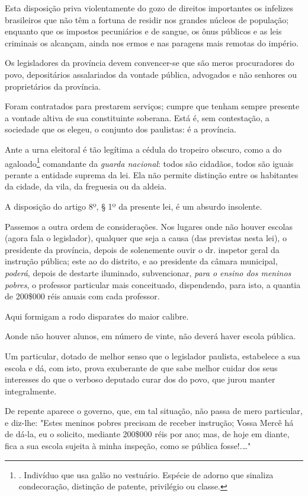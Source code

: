 Esta disposição priva violentamente do gozo de direitos importantes os
infelizes brasileiros que não têm a fortuna de residir nos grandes
núcleos de população; enquanto que os impostos pecuniários e de sangue,
os ônus públicos e as leis criminais os alcançam, ainda nos ermos e nas
paragens mais remotas do império.

Os legisladores da província devem convencer-se que são meros
procuradores do povo, depositários assalariados da vontade pública,
advogados e não senhores ou proprietários da província.

Foram contratados para prestarem serviços; cumpre que tenham sempre
presente a vontade altiva de sua constituinte soberana. Está é, sem
contestação, a sociedade que os elegeu, o conjunto dos paulistas: é a
província.

Ante a urna eleitoral é tão legítima a cédula do tropeiro obscuro, como
a do agaloado\footnote{. Indivíduo que usa galão no vestuário. Espécie
  de adorno que sinaliza condecoração, distinção de patente, privilégio
  ou classe.} comandante da \emph{guarda nacional}: todos são cidadãos,
todos são iguais perante a entidade suprema da lei. Ela não permite
distinção entre os habitantes da cidade, da vila, da freguesia ou da
aldeia.

A disposição do artigo 8º, § 1º da presente lei, é um absurdo insolente.

Passemos a outra ordem de considerações. Nos lugares onde não houver
escolas (agora fala o legislador), qualquer que seja a causa (das
previstas nesta lei), o presidente da província, depois de solenemente
ouvir o dr. inspetor geral da instrução pública; este ao do distrito, e
ao presidente da câmara municipal, \emph{poderá}, depois de destarte
iluminado, subvencionar, \emph{para o ensino dos meninos pobres}, o
professor particular mais conceituado, dispendendo, para isto, a quantia
de 200\$000 réis anuais com cada professor.

Aqui formigam a rodo disparates do maior calibre.

Aonde não houver alunos, em número de vinte, não deverá haver escola
pública.

Um particular, dotado de melhor senso que o legislador paulista,
estabelece a sua escola e dá, com isto, prova exuberante de que sabe
melhor cuidar dos seus interesses do que o verboso deputado curar dos do
povo, que jurou manter integralmente.

De repente aparece o governo, que, em tal situação, não passa de mero
particular, e diz-lhe: "Estes meninos pobres precisam de receber
instrução; Vossa Mercê há de dá-la, eu o solicito, mediante 200\$000
réis por ano; mas, de hoje em diante, fica a sua escola sujeita à minha
inspeção, como se pública fosse!.\ldots"

